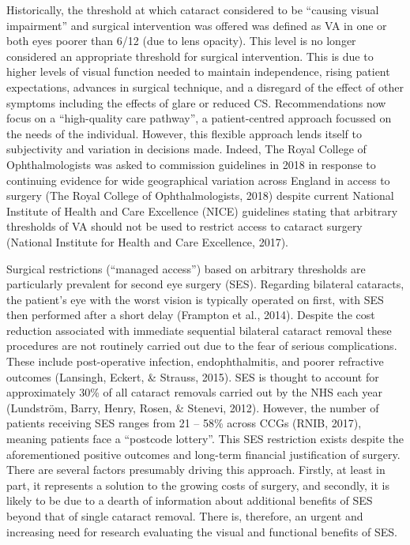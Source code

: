 \documentclass[
  english,
  man,floatsintext]{apa6}
\begin{document}
Historically, the threshold at which cataract considered to be \enquote{causing visual impairment} and surgical intervention was offered was defined as VA in one or both eyes poorer than 6/12 (due to lens opacity).
This level is no longer considered an appropriate threshold for surgical intervention.
This is due to higher levels of visual function needed to maintain independence, rising patient expectations, advances in surgical technique, and a disregard of the effect of other symptoms including the effects of glare or reduced CS.
Recommendations now focus on a \enquote{high-quality care pathway}, a patient-centred approach focussed on the needs of the individual.
However, this flexible approach lends itself to subjectivity and variation in decisions made.
Indeed, The Royal College of Ophthalmologists was asked to commission guidelines in 2018 in response to continuing evidence for wide geographical variation across England in access to surgery (The Royal College of Ophthalmologists, 2018) despite current National Institute of Health and Care Excellence (NICE) guidelines stating that arbitrary thresholds of VA should not be used to restrict access to cataract surgery (National Institute for Health and Care Excellence, 2017).

Surgical restrictions (\enquote{managed access}) based on arbitrary thresholds are particularly prevalent for second eye surgery (SES).
Regarding bilateral cataracts, the patient's eye with the worst vision is typically operated on first, with SES then performed after a short delay (Frampton et al., 2014).
Despite the cost reduction associated with immediate sequential bilateral cataract removal these procedures are not routinely carried out due to the fear of serious complications.
These include post-operative infection, endophthalmitis, and poorer refractive outcomes (Lansingh, Eckert, \& Strauss, 2015).
SES is thought to account for approximately 30\% of all cataract removals carried out by the NHS each year (Lundström, Barry, Henry, Rosen, \& Stenevi, 2012).
However, the number of patients receiving SES ranges from 21 -- 58\% across CCGs (RNIB, 2017), meaning patients face a \enquote{postcode lottery}.
This SES restriction exists despite the aforementioned positive outcomes and long-term financial justification of surgery.
There are several factors presumably driving this approach.
Firstly, at least in part, it represents a solution to the growing costs of surgery, and secondly, it is likely to be due to a dearth of information about additional benefits of SES beyond that of single cataract removal.
There is, therefore, an urgent and increasing need for research evaluating the visual and functional benefits of SES.
\end{document}
